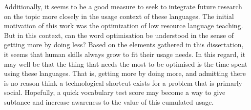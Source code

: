 Additionally, it seems to be a good measure to seek to integrate future research on the topic more closely in the usage context of these languages. The initial motivation of this work was the optimization of low resource language teaching. But in this context, can the word optimisation be understood in the sense of getting more by doing less? Based on the elements gathered in this dissertation, it seems that human skills always grow to fit their usage needs. In this regard, it may well be that the thing that needs the most to be optimised is the time spent using these languages. That is, getting more by doing more, and admitting there is no reason think a technological shortcut exists for a problem that is primarly social. Hopefully, a quick vocabulary test score may become a way to give subtance and increase awareness to the value of this cumulated usage. 
